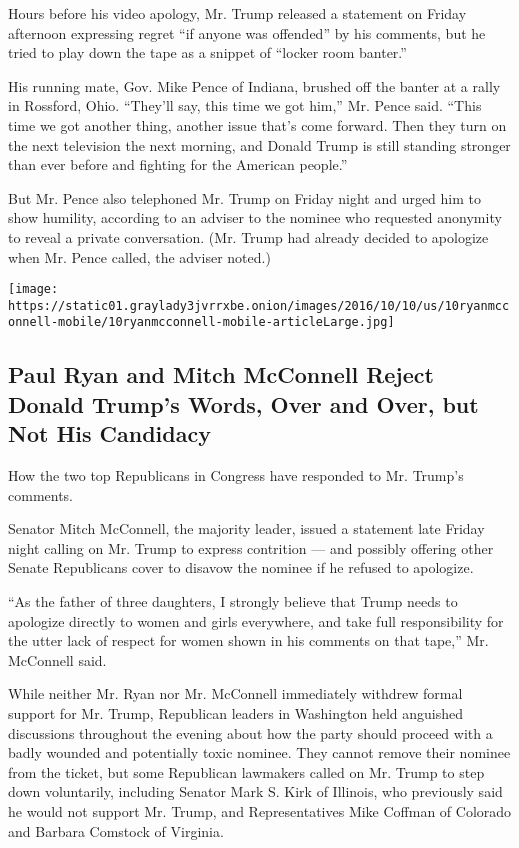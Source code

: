 Hours before his video apology, Mr. Trump released a statement on Friday
afternoon expressing regret ``if anyone was offended'' by his comments,
but he tried to play down the tape as a snippet of ``locker room
banter.''

His running mate, Gov. Mike Pence of Indiana, brushed off the banter at
a rally in Rossford, Ohio. ``They'll say, this time we got him,'' Mr.
Pence said. ``This time we got another thing, another issue that's come
forward. Then they turn on the next television the next morning, and
Donald Trump is still standing stronger than ever before and fighting
for the American people.''

But Mr. Pence also telephoned Mr. Trump on Friday night and urged him to
show humility, according to an adviser to the nominee who requested
anonymity to reveal a private conversation. (Mr. Trump had already
decided to apologize when Mr. Pence called, the adviser noted.)

\href{https://www.nytimes3xbfgragh.onion/interactive/2016/10/08/us/politics/how-paul-ryan-and-mitch-mcconnell-have-disavowed-trumps-words-but-not-their-support.html}{}

\texttt{[image: https://static01.graylady3jvrrxbe.onion/images/2016/10/10/us/10ryanmcconnell-mobile/10ryanmcconnell-mobile-articleLarge.jpg]}

\hypertarget{paul-ryan-and-mitch-mcconnell-reject-donald-trumps-words-over-and-over-but-not-his-candidacy}{%
\subsection{Paul Ryan and Mitch McConnell Reject Donald Trump's Words,
Over and Over, but Not His
Candidacy}\label{paul-ryan-and-mitch-mcconnell-reject-donald-trumps-words-over-and-over-but-not-his-candidacy}}

How the two top Republicans in Congress have responded to Mr. Trump's
comments.

Senator Mitch McConnell, the majority leader, issued a statement late
Friday night calling on Mr. Trump to express contrition --- and possibly
offering other Senate Republicans cover to disavow the nominee if he
refused to apologize.

``As the father of three daughters, I strongly believe that Trump needs
to apologize directly to women and girls everywhere, and take full
responsibility for the utter lack of respect for women shown in his
comments on that tape,'' Mr. McConnell said.

While neither Mr. Ryan nor Mr. McConnell immediately withdrew formal
support for Mr. Trump, Republican leaders in Washington held anguished
discussions throughout the evening about how the party should proceed
with a badly wounded and potentially toxic nominee. They cannot remove
their nominee from the ticket, but some Republican lawmakers called on
Mr. Trump to step down voluntarily, including Senator Mark S. Kirk of
Illinois, who previously said he would not support Mr. Trump, and
Representatives Mike Coffman of Colorado and Barbara Comstock of
Virginia.

